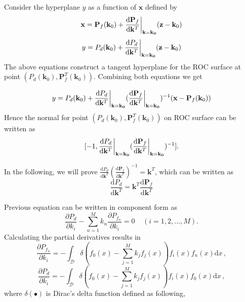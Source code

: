 \documentclass[12pt,journal,a4paper,twoside,onecolumn]{IEEEtran}
\begin{document}
\begin{spacing}{2.5}
Consider the hyperplane $y$ as a function of $\mathbf{x}$ defined by
\begin{equation}
\label{pro: x}
\mathbf{x} = \mathbf{P}_f(\mathbf{k}_0) + \frac{\mathrm{d}\mathbf{P}_f}{\mathrm{d}\mathbf{k}^T}\bigg{|}_{\mathbf{k}=\mathbf{k_0}}(\mathbf{z} - \mathbf{k}_0)
\end{equation}
\begin{equation}
\label{pro: y}
y = P_d(\mathbf{k}_0) + \frac{\mathrm{d}P_d}{\mathrm{d}\mathbf{k}^T}\bigg{|}_{\mathbf{k}=\mathbf{k_0}}(\mathbf{z} - \mathbf{k}_0)
\end{equation}
The above equations construct a tangent hyperplane for the ROC surface at point $(P_d(\mathbf{k}_0), \mathbf{P}_f^T(\mathbf{k}_0))$. Combining both equations  we get

\begin{equation}
\label{pro : y2}
y = P_d(\mathbf{k}_0) + \frac{\mathrm{d}P_d}{\mathrm{d}\mathbf{k}^T}\bigg{|}_{\mathbf{k}=\mathbf{k_0}}(
\frac{\mathrm{d}\mathbf{P}_f}{\mathrm{d}\mathbf{k}^T}\bigg{|}_{\mathbf{k}=\mathbf{k_0}}
)^{-1} (\mathbf{x} - \mathbf{P}_f(\mathbf{k}_0))
\end{equation}
Hence the normal for point $(P_d(\mathbf{k}_0), \mathbf{P}_f^T(\mathbf{k}_0))$ on ROC surface can be written as
\begin{equation}
\label{vec: normal}
[-1, \frac{\mathrm{d}P_d}{\mathrm{d}\mathbf{k}^T}\bigg{|}_{\mathbf{k}=\mathbf{k_0}}(
\frac{\mathrm{d}\mathbf{P}_f}{\mathrm{d}\mathbf{k}^T}\bigg{|}_{\mathbf{k}=\mathbf{k_0}}
)^{-1}
].
\end{equation}

In the following, we will prove $ \frac{\mathrm{d}P_d}{\mathrm{d}\mathbf{k}^T}(
\frac{\mathrm{d}\mathbf{P}_f}{\mathrm{d}\mathbf{k}^T}
)^{-1} = \mathbf{k}^T
$, which can be written as
\begin{equation}
\label{pro: vec}
\frac{\mathrm{d}P_d}{\mathrm{d}\mathbf{k}^T} = \mathbf{k}^T \frac{\mathrm{d}\mathbf{P}_f}{\mathrm{d}\mathbf{k}^T}
\end{equation}

Previous equation can be written in component form as
\begin{equation}
\label{pro: component}
\frac{\partial P_d}{\partial k_i} - \sum_{n=1}^{M}k_n\frac{\partial P_{f_n}}{\partial k_i} = 0 \;\;\;\;(i=1, 2, ..., M).
\end{equation}
Calculating the  partial derivatives results in
\begin{equation}
\label{pro: Pf par k}
\frac{\partial P_{f_n}}{ \partial k_i} = - \int_{\mathcal{D}}\delta (f_0(x) - \sum_{j=1}^{M}k_jf_j(x))f_i(x)f_n(x) \mathrm{d}x\,,
\end{equation}
\label{pro: Pd par k}
\begin{equation}\frac{\partial P_d}{ \partial k_i} = - \int_{\mathcal{D}}\delta (f_0(x) - \sum_{j=1}^{M}k_jf_j(x))f_i(x)f_0(x) \mathrm{d}x\,,
\end{equation}
where $\delta(\bullet)$ is Dirac's delta function defined as following,


\end{spacing}
\end{document}
